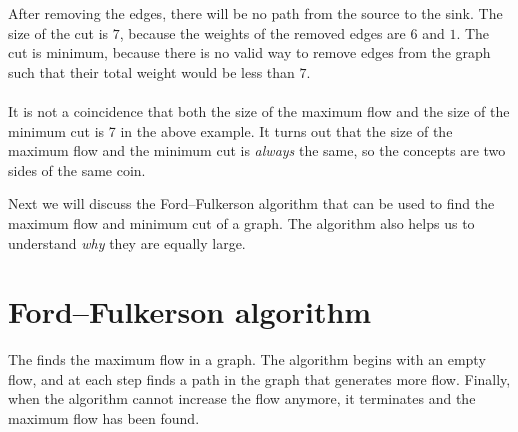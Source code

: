 \begin{center}
\end{center}

After removing the edges,
there will be no path from the source to the sink.
The size of the cut is $7$,
because the weights of the removed edges
are $6$ and $1$.
The cut is minimum, because there is no valid
way to remove edges from the graph such that
their total weight would be less than $7$.
\\\\
It is not a coincidence that
both the size of the maximum flow and 
the size of the minimum cut is 7 in the above example.
It turns out that the size of the maximum flow
and the minimum cut is
\emph{always} the same,
so the concepts are two sides of the same coin.

Next we will discuss the Ford–Fulkerson
algorithm that can be used to find
the maximum flow and minimum cut of a graph.
The algorithm also helps us to understand
\emph{why} they are equally large.

\section{Ford–Fulkerson algorithm}


The  \cite{for56} finds
the maximum flow in a graph.
The algorithm begins with an empty flow,
and at each step finds a path in the graph
that generates more flow.
Finally, when the algorithm cannot increase the flow
anymore, it terminates and the maximum flow has been found.

